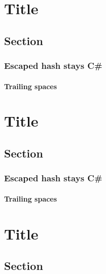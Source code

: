 \section{Title}

\subsection{Section}

\subsubsection{Escaped hash stays C\#}

\paragraph{Trailing spaces}

\subsection{}
\section{Title}

\subsection{Section}

\subsubsection{Escaped hash stays C\#}

\paragraph{Trailing spaces}

\subsection{}
\section{Title}

\subsection{Section}


